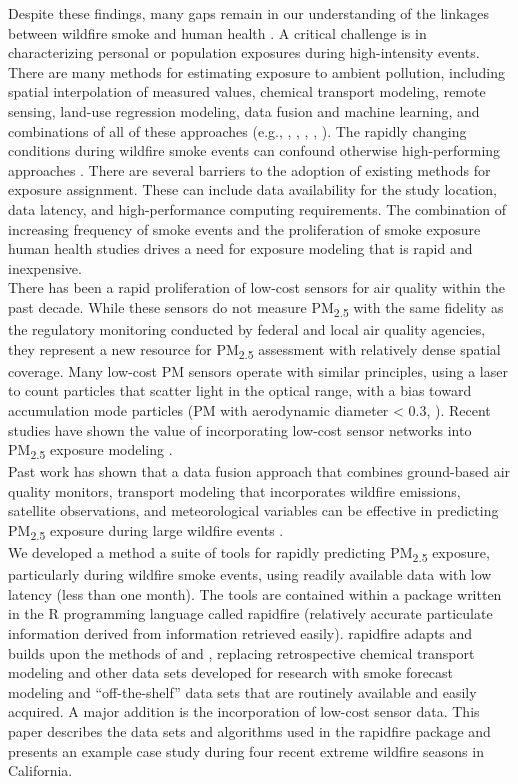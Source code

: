 \documentclass[gmd, manuscript]{copernicus}
\begin{document}
Despite these findings, many gaps remain in our understanding of the
linkages between wildfire smoke and human health \citep{Black2017}. A
critical challenge is in characterizing personal or population exposures
during high-intensity events. There are many methods for estimating
exposure to ambient pollution, including spatial interpolation of
measured values, chemical transport modeling, remote sensing, land-use
regression modeling, data fusion and machine learning, and combinations
of all of these approaches (e.g., \citet{Reid2015}, \citet{Zhang2020},
\citet{Al-Hamdan2014}, \citet{Cleland2020}, \citet{Hoek2008}). The
rapidly changing conditions during wildfire smoke events can confound
otherwise high-performing approaches \citep{ONeill2021}. There are
several barriers to the adoption of existing methods for exposure
assignment. These can include data availability for the study location,
data latency, and high-performance computing requirements. The
combination of increasing frequency of smoke events and the
proliferation of smoke exposure human health studies drives a need for
exposure modeling that is rapid and inexpensive.\\
There has been a rapid proliferation of low-cost sensors for air quality
within the past decade. While these sensors do not measure
PM\textsubscript{2.5} with the same fidelity as the regulatory
monitoring conducted by federal and local air quality agencies, they
represent a new resource for PM\textsubscript{2.5} assessment with
relatively dense spatial coverage. Many low-cost PM sensors operate with
similar principles, using a laser to count particles that scatter light
in the optical range, with a bias toward accumulation mode particles (PM
with aerodynamic diameter \textless{} 0.3, \citet{Ouimette2022}). Recent
studies have shown the value of incorporating low-cost sensor networks
into PM\textsubscript{2.5} exposure modeling \citep{Bi2020}.\\
Past work has shown that a data fusion approach that combines
ground-based air quality monitors, transport modeling that incorporates
wildfire emissions, satellite observations, and meteorological variables
can be effective in predicting PM\textsubscript{2.5} exposure during
large wildfire events \citep[ and \citet{ONeill2021}]{Zou2019}.\\
We developed a method a suite of tools for rapidly predicting
PM\textsubscript{2.5} exposure, particularly during wildfire smoke
events, using readily available data with low latency (less than one
month). The tools are contained within a package written in the R
programming language called rapidfire (relatively accurate particulate
information derived from information retrieved easily). rapidfire adapts
and builds upon the methods of \citet{Zou2019} and \citet{ONeill2021},
replacing retrospective chemical transport modeling and other data sets
developed for research with smoke forecast modeling and
``off-the-shelf'' data sets that are routinely available and easily
acquired. A major addition is the incorporation of low-cost sensor data.
This paper describes the data sets and algorithms used in the rapidfire
package and presents an example case study during four recent extreme
wildfire seasons in California.
\end{document}
